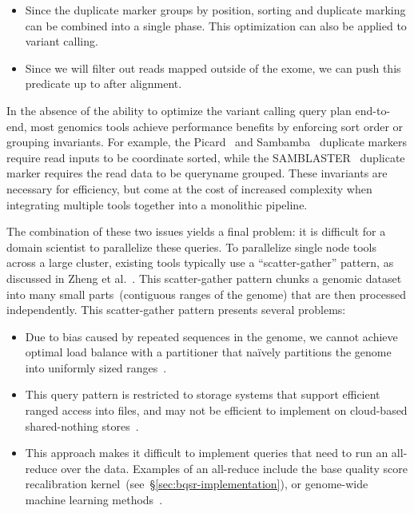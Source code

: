 \documentclass[phd]{ucbthesis}
\begin{document}
\begin{itemize}
\item Since the duplicate marker groups by position, sorting and duplicate
  marking can be combined into a single phase. This optimization can also be
  applied to variant calling.
\item Since we will filter out reads mapped outside of the exome, we can push
  this predicate up to after alignment.
\end{itemize}

In the absence of the ability to optimize the variant calling query plan
end-to-end, most genomics tools achieve performance benefits by enforcing
sort order or grouping invariants. For example, the
{Picard}~\cite{picard} and {Sambamba}~\cite{tarasov15}
duplicate markers require read inputs to be coordinate sorted, while the
{SAMBLASTER}~\cite{faust14} duplicate marker requires the read data to
be queryname grouped. These invariants are necessary for efficiency, but come at
the cost of increased complexity when integrating multiple tools together into
a monolithic pipeline.

The combination of these two issues yields a final problem: it is difficult for
a domain scientist to parallelize these queries. To parallelize single node
tools across a large cluster, existing tools typically use a ``scatter-gather''
pattern, as discussed in Zheng et al.~\cite{zhang15, zhang16}. This
scatter-gather pattern chunks a genomic dataset into many small
parts~(contiguous ranges of the genome) that are then processed independently.
This scatter-gather pattern presents several problems:

\begin{itemize}
\item Due to bias caused by repeated sequences in the genome, we cannot achieve
  optimal load balance with a partitioner that na\"{i}vely partitions the genome
  into uniformly sized ranges~\cite{chiang15}.
\item This query pattern is restricted to storage systems that support efficient
  ranged access into files, and may not be efficient to implement on cloud-based
  shared-nothing stores~\cite{vivian17}.
\item This approach makes it difficult to implement queries that need to run an
  all-reduce over the data. Examples of an all-reduce include the base quality score
  recalibration kernel~(see~\S\ref{sec:bqsr-implementation}), or genome-wide
  machine learning methods~\cite{morrow17cks}.
\end{itemize}
  
\end{document}
